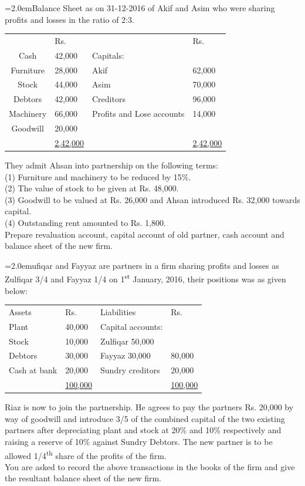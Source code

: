 \documentclass[11pt,a4paper]{article}
\newcommand{\lqn}[2]{\Needspace{6\baselineskip}\par\medskip\noindent\hangindent=2.0em\hangafter=1\makebox[2.0em][l]{\textbf{#1.}}#2\par}
\begin{document}
\lqn{92}{Balance Sheet as on 31-12-2016 of Akif and Asim who were sharing profits and losses in the ratio of 2:3.\par
\par\smallskip\noindent\hspace*{1.2em}\begin{tabular}{|clll|}
\hline
 & Rs. &  & Rs. \\
Cash & 42,000 & Capitals: &  \\
Furniture & 28,000 & Akif & 62,000 \\
Stock & 44,000 & Asim & 70,000 \\
Debtors & 42,000 & Creditors & 96,000 \\
Machinery & 66,000 & Profits and Lose accounts & 14,000 \\
Goodwill & 20,000 &  &  \\
 & \underline{2,42,000} &  & \underline{2,42,000} \\
\hline
\end{tabular}\par\smallskip
They admit Ahsan into partnership on the following terms:\\
(1) Furniture and machinery to be reduced by 15\%.\\
(2) The value of stock to be given at Rs. 48,000.\\
(3) Goodwill to be valued at Rs. 26,000 and Ahsan introduced Rs. 32,000 towards capital.\\
(4) Outstanding rent amounted to Rs. 1,800.\\
Prepare revaluation account, capital account of old partner, cash account and balance sheet of the new firm.\par
}
\lqn{93}{ufiqar and Fayyaz are partners in a firm sharing profits and losses as Zulfiqar 3/4 and Fayyaz 1/4 on 1\textsuperscript{st} January, 2016, their positions was as given below:\par
\par\smallskip\noindent\hspace*{1.2em}\begin{tabular}{|llll|}
\hline
Assets & Rs. & Liabilities & Rs. \\
Plant & 40,000 & Capital accounts: &  \\
Stock & 10,000 & Zulfiqar      50,000 &  \\
Debtors & 30,000 & Fayyaz      30,000 & 80,000 \\
Cash at bank & 20,000 & Sundry creditors & 20,000 \\
 & \underline{100,000} &  & \underline{100,000} \\
\hline
\end{tabular}\par\smallskip
Riaz is now to join the partnership. He agrees to pay the partners Rs. 20,000 by way of goodwill and introduce 3/5 of the combined capital of the two existing partners after depreciating plant and stock at 20\% and 10\% respectively and raising a reserve of 10\% against Sundry Debtors. The new partner is to be allowed 1/4\textsuperscript{th}  share of the profits of the firm.\\
You are asked to record the above transactions in the books of the firm and give the resultant balance sheet of the new firm.\par
}
\end{document}
